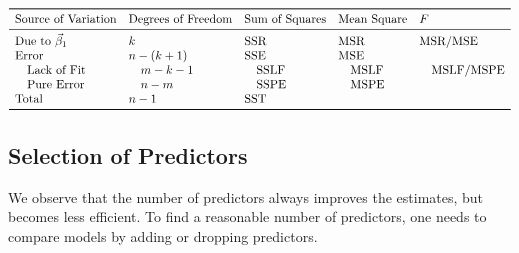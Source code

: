 \[ \begin{array}{lllll}
        \toprule
        \text{Source of Variation}     & \text{Degrees of Freedom} & \text{Sum of Squares} & \text{Mean Square} & F                             \\
        \midrule
        \text{Due to }\Vector{\beta}_1 & k                         & \SSR                  & \MSR               & \MSR/\MSE                     \\
        \text{Error}                   & n-(k+1)                   & \SSE                  & \MSE                                               \\
        \quad\text{Lack of Fit}        & \quad m-k-1               & \quad \SSLF           & \quad\text{MSLF}   & \quad \text{MSLF}/\text{MSPE} \\
        \quad\text{Pure Error}         & \quad n-m                 & \quad \SSPE           & \quad\text{MSPE}                                   \\
        \text{Total}                   & n-1                       & \SST                                                                       \\
        \bottomrule
    \end{array} \]
\subsection*{Selection of Predictors}
We observe that the number of predictors always improves the estimates,
but becomes less efficient. To find a reasonable number of
predictors, one needs to compare models by adding or dropping predictors.

